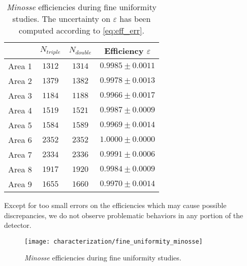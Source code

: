 \begin{table}
	\centering
	\begin{tabular}{r|ccc}
		\toprule
		&$N_{triple}$&$N_{double}$&Efficiency $\varepsilon$\\
		\midrule
		Area 1 & $1312$	& $1314$ &	$0.9985\pm	0.0011$\\
		Area 2 & $1379$	& $1382$ &	$0.9978\pm	0.0013$\\
		Area 3 & $1184$	& $1188$ &	$0.9966\pm	0.0017$\\
		Area 4 & $1519$	& $1521$ &	$0.9987\pm	0.0009$\\
		Area 5 & $1584$	& $1589$ &	$0.9969\pm	0.0014$\\
		Area 6 & $2352$	& $2352$ &	$1.0000\pm	0.0000$\\
		Area 7 & $2334$	& $2336$ &	$0.9991\pm	0.0006$\\
		Area 8 & $1917$	& $1920$ &	$0.9984\pm	0.0009$\\
		Area 9 & $1655$	& $1660$ &	$0.9970\pm	0.0014$\\
		\bottomrule
	\end{tabular}
    \caption{\emph{Minosse} efficiencies during fine uniformity studies. The uncertainty on $\varepsilon$ has been computed according to \eqref{eq:eff_err}.} \label{tab:fine_eff}
\end{table}

Except for too small errors on the efficiencies which may cause possible discrepancies, we do not observe problematic behaviors in any portion of the detector.

\begin{figure}[!bht]
	\centering
	\texttt{[image: characterization/fine\_uniformity\_minosse]}
	\caption{\emph{Minosse} efficiencies during fine uniformity studies.} \label{fig:fine_eff}
\end{figure}
